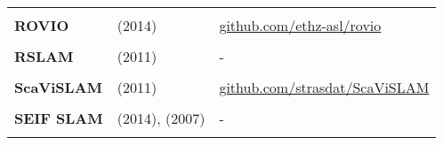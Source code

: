 \documentclass[a4paper,12pt]{scrartcl}
\begin{document}
{\begin{longtable}{l|l|l}
                                                                                                                                  &                                                                                            &   \\ [-3mm]
    \textbf{ROVIO}                                                                                                                & \cite{Bloesch2015} (2014)
                                                                                                                                  & {\href{https://github.com/ethz-asl/rovio}{github.com/ethz-asl/rovio}}                     \\
                                                                                                                                  &                                                                                            &   \\ [-3mm]
    \textbf{RSLAM}                                                                                                                & \cite{Mei2011} (2011)                                                                      & - \\
                                                                                                                                  &                                                                                            &   \\ [-3mm]
    \textbf{ScaViSLAM}                                                                                                            & \cite{Strasdat2011} (2011)
                                                                                                                                  & {\href{https://github.com/strasdat/ScaViSLAM}{github.com/strasdat/ScaViSLAM}}             \\
                                                                                                                                  &                                                                                            &   \\ [-3mm]
    \textbf{SEIF SLAM}                                                                                                            & \cite{Torres-Gonzalez2014} (2014), \cite{Walter2007} (2007)                                & - \\
                                                                                                                                  &                                                                                            &   \\ [-3mm]

\end{longtable}}
\end{document}
